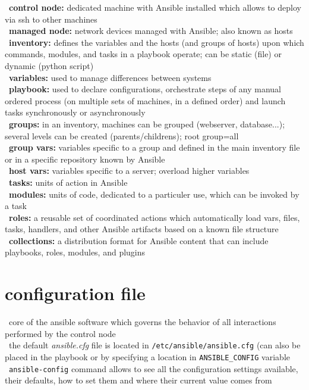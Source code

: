 \documentclass{refcard}
\begin{document}
\textbullet\ \textbf{control node:} dedicated machine with Ansible installed which allows to deploy via ssh to other machines \\
\textbullet\ \textbf{managed node:} network devices managed with Ansible; also known as hosts\\
\textbullet\ \textbf{inventory:} defines the variables and the hosts (and groups of hosts) upon which commands, modules, and tasks in a playbook operate; can be static (file) or dynamic (python script)\\
\textbullet\ \textbf{variables:} used to manage differences between systems\\
\textbullet\ \textbf{playbook:} used to declare configurations, orchestrate steps of any manual ordered process (on multiple sets of machines, in a defined order) and launch tasks synchronously or asynchronously\\
\textbullet\ \textbf{groups:} in an inventory, machines can be grouped (webserver, database...); several levels can be created (parents/childrens); root group=all\\
\textbullet\ \textbf{group vars:} variables specific to a group and defined in the main inventory file or in a specific repository known by Ansible\\ 
\textbullet\ \textbf{host vars:} variables specific to a server; overload higher variables\\
\textbullet\ \textbf{tasks:} units of action in Ansible\\
\textbullet\ \textbf{modules:} units of code, dedicated to a particuler use, which can be invoked by a task\\
\textbullet\ \textbf{roles:} a reusable set of coordinated actions which automatically load vars, files, tasks, handlers, and other Ansible artifacts based on a known file structure\\
\textbullet\ \textbf{collections:} a distribution format for Ansible content that can include playbooks, roles, modules, and plugins

\section{configuration file}

\textbullet\ core of the ansible software which governs the behavior of all interactions performed by the control node\\
\textbullet\ the default \textit{ansible.cfg} file is located in \verb|/etc/ansible/ansible.cfg| (can also be placed in the playbook or by specifying a location in \verb|ANSIBLE_CONFIG| variable\\
\textbullet\ \verb|ansible-config| command allows to see all the configuration settings available, their defaults, how to set them and where their current value comes from
\end{document}
